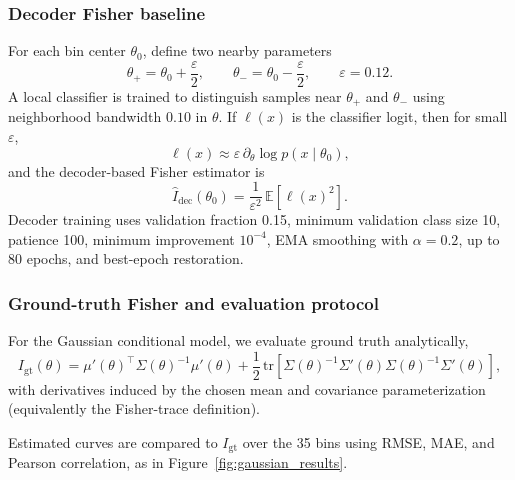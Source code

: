 \subsubsection*{Decoder Fisher baseline}
For each bin center $\theta_0$, define two nearby parameters
\[
\theta_+=\theta_0+\frac{\varepsilon}{2},\qquad \theta_-=\theta_0-\frac{\varepsilon}{2},\qquad \varepsilon=0.12.
\]
A local classifier is trained to distinguish samples near $\theta_+$ and $\theta_-$ using neighborhood bandwidth $0.10$ in $\theta$. If $\ell(x)$ is the classifier logit, then for small $\varepsilon$,
\[
\ell(x)\approx \varepsilon\,\partial_\theta\log p(x\mid\theta_0),
\]
and the decoder-based Fisher estimator is
\[
\widehat I_{\mathrm{dec}}(\theta_0)=\frac{1}{\varepsilon^2}\,\mathbb E\!\left[\ell(x)^2\right].
\]
Decoder training uses validation fraction 0.15, minimum validation class size 10, patience 100, minimum improvement $10^{-4}$, EMA smoothing with $\alpha=0.2$, up to 80 epochs, and best-epoch restoration.

\subsubsection*{Ground-truth Fisher and evaluation protocol}
For the Gaussian conditional model, we evaluate ground truth analytically,
\[
I_{\mathrm{gt}}(\theta)=\mu'(\theta)^\top\Sigma(\theta)^{-1}\mu'(\theta)
+\frac{1}{2}\,\mathrm{tr}\!\left[\Sigma(\theta)^{-1}\Sigma'(\theta)\Sigma(\theta)^{-1}\Sigma'(\theta)\right],
\]
with derivatives induced by the chosen mean and covariance parameterization (equivalently the Fisher-trace definition).

Estimated curves are compared to $I_{\mathrm{gt}}$ over the 35 bins using RMSE, MAE, and Pearson correlation, as in Figure~\ref{fig:gaussian_results}.
